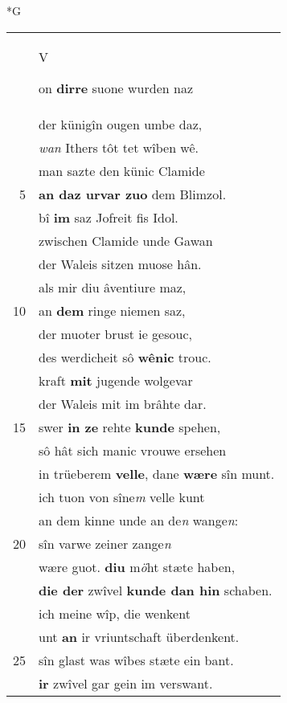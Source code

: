 \documentclass[8pt,a4paper,notitlepage]{article}
\begin{document}
\newpage
\begin{table}[ht]
\begin{minipage}[t]{0.5\linewidth}
\small
\begin{center}*G
\end{center}
\begin{tabular}{rl}
 & \begin{large}V\end{large}on \textbf{dirre} suone wurden naz\\ 
 & der künigîn ougen umbe daz,\\ 
 & \textit{wan} Ithers tôt tet wîben wê.\\ 
 & man sazte den künic Clamide\\ 
5 & \textbf{an daz urvar zuo} dem Blimzol.\\ 
 & bî \textbf{im} saz Jofreit fis Idol.\\ 
 & zwischen Clamide unde Gawan\\ 
 & der Waleis sitzen muose hân.\\ 
 & als mir diu âventiure maz,\\ 
10 & an \textbf{dem} ringe niemen saz,\\ 
 & der muoter brust ie gesouc,\\ 
 & des werdicheit sô \textbf{wênic} trouc.\\ 
 & kraft \textbf{mit} jugende wolgevar\\ 
 & der Waleis mit im brâhte dar.\\ 
15 & swer \textbf{in ze} rehte \textbf{kunde} spehen,\\ 
 & sô hât sich manic vrouwe ersehen\\ 
 & in trüeberem \textbf{velle}, dane \textbf{wære} sîn munt.\\ 
 & ich tuon von sîne\textit{m} velle kunt\\ 
 & an dem kinne unde an de\textit{n} wange\textit{n}:\\ 
20 & sîn varwe zeiner zange\textit{n}\\ 
 & wære guot. \textbf{diu} m\textit{ö}ht stæte haben,\\ 
 & \textbf{die der} zwîvel \textbf{kunde dan hin} schaben.\\ 
 & ich meine wîp, die wenkent\\ 
 & unt \textbf{an} ir vriuntschaft überdenkent.\\ 
25 & sîn glast was wîbes stæte ein bant.\\ 
 & \textbf{ir} zwîvel gar gein im verswant.\\ 

\end{tabular}
\end{minipage}
\end{table}
\end{document}
